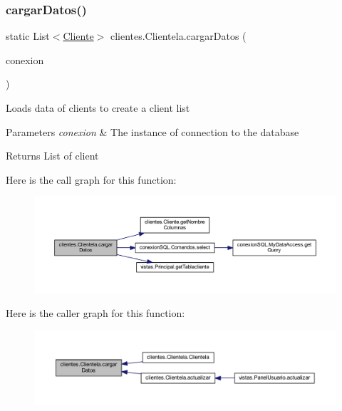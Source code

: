 \subsubsection{\texorpdfstring{cargar\+Datos()}{cargarDatos()}}
{\footnotesize\ttfamily static List$<$\mbox{\hyperlink{classclientes_1_1_cliente}{Cliente}}$>$ clientes.\+Clientela.\+cargar\+Datos (\begin{DoxyParamCaption}\item[{\mbox{\hyperlink{classconexion_s_q_l_1_1_my_data_access}{My\+Data\+Access}}}]{conexion }\end{DoxyParamCaption})\hspace{0.3cm}{\ttfamily [static]}}

Loads data of clients to create a client list 
\begin{DoxyParams}{Parameters}
{\em conexion} & The instance of connection to the database \\
\hline
\end{DoxyParams}
\begin{DoxyReturn}{Returns}
List of client 
\end{DoxyReturn}
Here is the call graph for this function\+:\nopagebreak
\begin{figure}[H]
\begin{center}
\leavevmode
\includegraphics[width=350pt]{classclientes_1_1_clientela_a2892095286ae0f52220099674a8b90d8_cgraph}
\end{center}
\end{figure}
Here is the caller graph for this function\+:\nopagebreak
\begin{figure}[H]
\begin{center}
\leavevmode
\includegraphics[width=350pt]{classclientes_1_1_clientela_a2892095286ae0f52220099674a8b90d8_icgraph}
\end{center}
\end{figure}
\mbox{\label{classclientes_1_1_clientela_a1d531f14dc541569b84f1f72c760d376}} 
